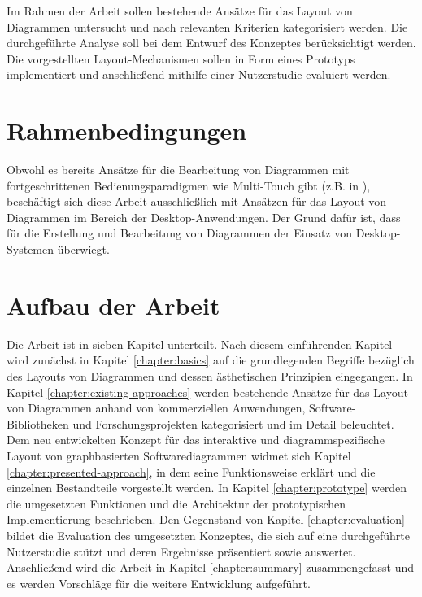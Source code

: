 Im Rahmen der Arbeit sollen bestehende Ansätze für das Layout von Diagrammen untersucht und nach relevanten Kriterien kategorisiert werden. Die durchgeführte Analyse soll bei dem Entwurf des Konzeptes berücksichtigt werden. Die vorgestellten Layout-Mechanismen sollen in Form eines Prototyps implementiert und anschließend mithilfe einer Nutzerstudie evaluiert werden.

\section{Rahmenbedingungen}
\label{sec:thesis-conditions}

Obwohl es bereits Ansätze für die Bearbeitung von Diagrammen mit fortgeschrittenen Bedienungsparadigmen wie Multi-Touch gibt (z.B. in \cite{FrischHeydekorn10Diagram}), beschäftigt sich diese Arbeit ausschließlich mit Ansätzen für das Layout von Diagrammen im Bereich der Desktop-Anwendun\-gen. Der Grund dafür ist, dass für die Erstellung und Bearbeitung von Diagrammen der Einsatz von Desktop-Systemen überwiegt.

\section{Aufbau der Arbeit}

Die Arbeit ist in sieben Kapitel unterteilt. Nach diesem einführenden Kapitel wird zunächst in Kapitel \ref{chapter:basics} auf die grundlegenden Begriffe bezüglich des Layouts von Diagrammen und dessen ästhetischen Prinzipien eingegangen. In Kapitel \ref{chapter:existing-approaches} werden bestehende Ansätze für das Layout von Diagrammen anhand von kommerziellen Anwendungen, Software-Bibliotheken und Forschungsprojekten kategorisiert und im Detail beleuchtet. Dem neu entwickelten Konzept für das interaktive und diagrammspezifische Layout von graphbasierten Softwarediagrammen widmet sich Kapitel \ref{chapter:presented-approach}, in dem seine Funktionsweise erklärt und die einzelnen Bestandteile vorgestellt werden. In Kapitel \ref{chapter:prototype} werden die umgesetzten Funktionen und die Architektur der prototypischen Implementierung beschrieben. Den Gegenstand von Kapitel \ref{chapter:evaluation} bildet die Evaluation des umgesetzten Konzeptes, die sich auf eine durchgeführte Nutzerstudie stützt und deren Ergebnisse präsentiert sowie auswertet. Anschließend wird die Arbeit in Kapitel \ref{chapter:summary} zusammengefasst und es werden Vorschläge für die weitere Entwicklung aufgeführt.
